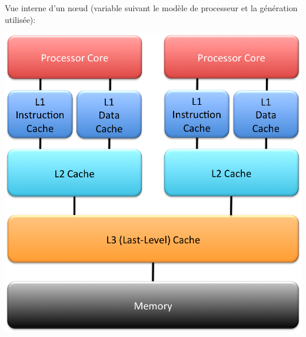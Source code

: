 \documentclass{beamer}
\begin{document}
\begin{frame}
Vue interne d'un n\oe ud (variable suivant le mod\`ele de processeur et la g\'en\'eration utilis\'ee):

\begin{center}
\includegraphics[scale=0.3]{architecture2}
\end{center}

\end{frame}
\end{document}
